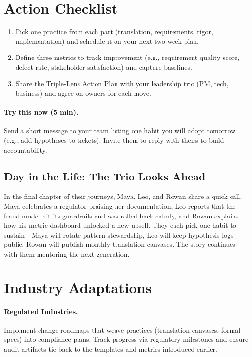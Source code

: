 \section{Action Checklist}
\label{sec:conclusion-actions}
\begin{enumerate}
    \item Pick one practice from each part (translation, requirements, rigor, implementation) and schedule it on your next two-week plan.
    \item Define three metrics to track improvement (e.g., requirement quality score, defect rate, stakeholder satisfaction) and capture baselines.
    \item Share the Triple-Lens Action Plan with your leadership trio (PM, tech, business) and agree on owners for each move.
\end{enumerate}

\paragraph{Try this now (5 min).} Send a short message to your team listing one habit you will adopt tomorrow (e.g., add hypotheses to tickets). Invite them to reply with theirs to build accountability.

\subsection{Day in the Life: The Trio Looks Ahead}
In the final chapter of their journeys, Maya, Leo, and Rowan share a quick call. Maya celebrates a regulator praising her documentation, Leo reports that the fraud model hit its guardrails and was rolled back calmly, and Rowan explains how his metric dashboard unlocked a new upsell. They each pick one habit to sustain—Maya will rotate pattern stewardship, Leo will keep hypothesis logs public, Rowan will publish monthly translation canvases. The story continues with them mentoring the next generation.

\section{Industry Adaptations}
\label{sec:conclusion-industry}
\paragraph{Regulated Industries.} Implement change roadmaps that weave practices (translation canvases, formal specs) into compliance plans. Track progress via regulatory milestones and ensure audit artifacts tie back to the templates and metrics introduced earlier.

